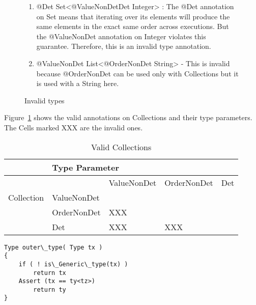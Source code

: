 \begin{figure}[h]\caption{Invalid types}
  \begin{enumerate}
    \item @Det Set<@ValueNonDetDet Integer> : The @Det annotation on Set means that iterating over its elements will produce the same
    elements in the exact same order across executions. But the @ValueNonDet annotation on Integer violates this guarantee. Therefore, this is an invalid type annotation.
    \item @ValueNonDet List<@OrderNonDet String> - This is invalid because @OrderNonDet can be used only with Collections but it is used with a String here.
  \end{enumerate}
\end{figure}

Figure~\ref{fig-nondeterminism-collections} shows the valid annotations on Collections and their type parameters.
The Cells marked XXX are the invalid ones.
\begin{table}
  \centering
  \begin{tabular}{|l|l|l|l|l|}
    \hline
    &     \multicolumn{4}{l|}{Type Parameter}                                                                       \\ \hline
    &             & ValueNonDet                                     & OrderNonDet              & Det \\ \cline{2-5}
    Collection    & ValueNonDet &                                                 &                          &     \\ \cline{2-5}
    & OrderNonDet &   XXX  &                          &     \\ \cline{2-5}
    & Det         &         XXX               &    XXX  &     \\ \hline
  \end{tabular}
  \caption{Valid Collections}
  \label{fig-nondeterminism-collections}
\end{table}



\begin{verbatim}
Type outer\_type( Type tx )
{
    if ( ! is\_Generic\_type(tx) )
        return tx
    Assert (tx == ty<tz>)
        return ty
}
\end{verbatim}

